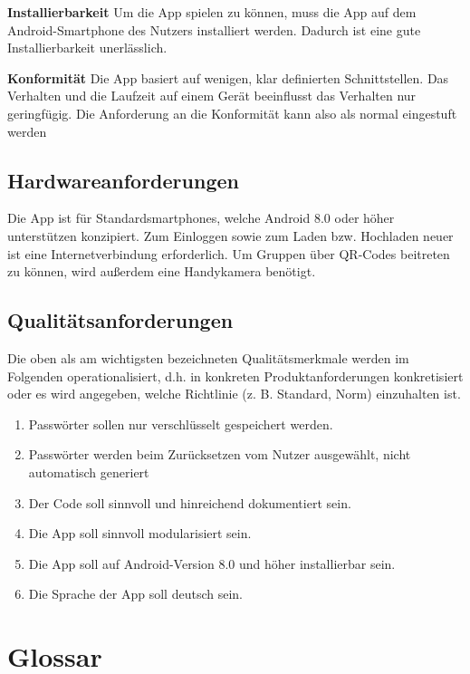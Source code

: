 \documentclass[parskip=full]{scrartcl}
\begin{document}
\textbf{Installierbarkeit}\newline
Um die App spielen zu können, muss die App auf dem Android-Smartphone des Nutzers installiert werden.
Dadurch ist eine gute Installierbarkeit unerlässlich.

\textbf{Konformität}\newline
Die App basiert auf wenigen, klar definierten Schnittstellen. Das Verhalten und die Laufzeit auf einem Gerät beeinflusst das Verhalten nur geringfügig. Die Anforderung an die Konformität kann also als normal eingestuft werden

\subsection{Hardwareanforderungen}
Die App ist für Standardsmartphones, welche Android 8.0 oder höher unterstützen konzipiert. Zum Einloggen sowie zum Laden bzw. Hochladen neuer  ist eine Internetverbindung erforderlich. Um Gruppen über QR-Codes beitreten zu können, wird außerdem eine Handykamera benötigt.


\subsection{Qualitätsanforderungen}
Die oben als am wichtigsten bezeichneten Qualitätsmerkmale werden im Folgenden operationalisiert, d.h. in konkreten Produktanforderungen konkretisiert oder es wird angegeben, welche Richtlinie (z. B. Standard, Norm) einzuhalten ist.

\begin{enumerate}[start=1,label={$\langle$\bfseries Q\arabic*$\rangle$}, leftmargin = 5em, itemsep=4pt, parsep=4pt]
    \item Passwörter sollen nur verschlüsselt gespeichert werden.
    \item Passwörter werden beim Zurücksetzen vom Nutzer ausgewählt, nicht automatisch generiert
    \item Der Code soll sinnvoll und hinreichend dokumentiert sein.
    \item Die App soll sinnvoll modularisiert sein.
    \item Die App soll auf Android-Version 8.0 und höher installierbar sein.
    \item Die Sprache der App soll deutsch sein.
\end{enumerate}

\section{Glossar}
\printglossary[style=altlist]
\end{document}
